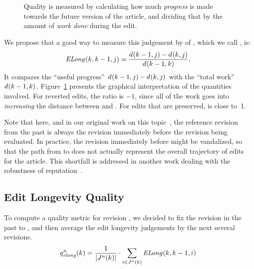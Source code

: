 \begin{figure}
\centering
{}
\caption{Quality is measured by calculating how much \textit{progress}
	is made towards the future version of the article,
	and dividing that by the amount of \textit{work done}
	during the edit.}
\label{fig-editlong}
\end{figure}

We propose that a good way to measure this judgement
by  of ,
which we call , is:
\begin{equation}
\esurv{}{k,k-1,j} = \frac{\dist{}{k-1,j} - \dist{}{k,j}}
                        {\dist{}{k-1,k}},
\label{eq:esurv}
\end{equation}
It compares the ``useful progress''
$d_{}(k-1,j) - d_{}(k,j)$
with the ``total work''
$d_{}(k-1,k)$.
Figure~\ref{fig-editlong} presents the graphical interpretation
of the quantities involved.
  For reverted edits, the ratio 
  is $-1$, since all of the work
  goes into \textit{increasing} the distance between  and .
  For edits that are preserved,  is close to~1.

Note that here, and in our original work on
this topic~\cite{Adler2007}, the reference revision from the past is always
the revision immediately before the revision being evaluated.
In practice, the revision immediately before might be vandalized,
so that the path from  to  does not
actually represent the overall trajectory of edits for the
article.
This shortfall is addressed in another work dealing with
the robustness of reputation~\cite{Chatterjee2008}.

\subsection{Edit Longevity Quality}


To compute a quality metric for revision ,
we decided to fix the revision in the past to ,
and then average the edit longevity judgements by the
next several revisions.
\begin{equation*}
\quality{elong}{n}{k} = \frac{1}{|\judges{}{n}{k}|} \cdot
      \sum_{i \in \judges{}{n}{k}} \esurv{}{k,k-1,i}
\end{equation*}

